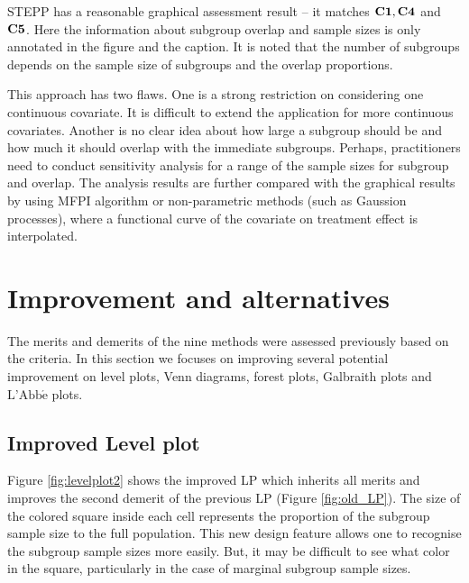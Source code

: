\documentclass[Afour,sagev,times, doublespace]{sagej}
\begin{document}
{STEPP has a reasonable graphical assessment result -- it matches $\bf{C1}, \bf{C4}$ and $\bf{C5}$. Here the information about subgroup overlap and sample sizes is only annotated in the figure and the caption. It is noted that the number of subgroups depends on the sample size of subgroups and the overlap proportions.

This approach has two flaws. One is a strong restriction on considering one continuous covariate. It is difficult to extend the application for more continuous covariates. Another is no clear idea about how large a subgroup should be and how much it should overlap with the immediate subgroups. Perhaps, practitioners need to conduct sensitivity analysis for a range of the sample sizes for subgroup and overlap. The analysis results are further compared with the graphical results by using MFPI algorithm \cite{Royston:04, Sauerbrei:07} or non-parametric methods (such as Gaussion processes\cite{Rasmussen:06}), where a functional curve of the covariate on treatment effect is interpolated.


\section{Improvement and alternatives}

The merits and demerits of the nine methods were assessed previously based on the criteria. In this section we focuses on improving several potential improvement on level plots, Venn diagrams, forest plots, Galbraith plots and $\text{L'Abb}\acute{\text{e}}$ plots.

\subsection{Improved Level plot}

Figure \ref{fig:levelplot2} shows the improved LP which inherits all merits and improves the second demerit of the previous LP (Figure \ref{fig:old_LP}). The size of the colored square inside each cell represents the proportion of the subgroup sample size to the full population. This new design feature allows one to recognise the subgroup sample sizes more easily. But, it may be difficult to see what color in the square, particularly in the case of marginal subgroup sample sizes.

}
\end{document}
